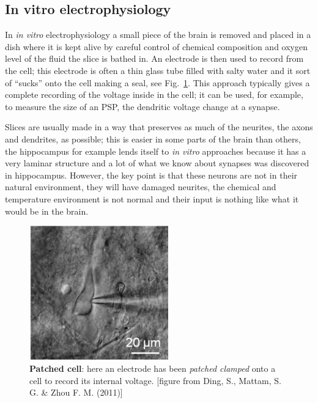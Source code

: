 \documentclass[12pt]{article}
\begin{document}
\subsection*{In vitro electrophysiology}

In \textsl{in vitro} electrophysiology a small piece of the brain is
removed and placed in a dish where it is kept alive by careful control
of chemical composition and oxygen level of the fluid the slice is
bathed in. An electrode is then used to record from the cell; this
electrode is often a thin glass tube filled with salty water and it
sort of ``sucks'' onto the cell making a seal, see
Fig.~\ref{fig:patch}. This approach typically gives a complete
recording of the voltage inside in the cell; it can be used, for
example, to measure the size of an PSP, the dendritic voltage change
at a synapse.

Slices are usually made in a way that preserves as much of the
neurites, the axons and dendrites, as possible; this is easier in some
parts of the brain than others, the hippocampus for example lends
itself to \textsl{in vitro} approaches because it has a very laminar
structure and a lot of what we know about synapses was discovered in
hippocampus. However, the key point is that these neurons are not in
their natural environment, they will have damaged neurites, the
chemical and temperature environment is not normal and their input is
nothing like what it would be in the brain.

\begin{figure}
  \begin{center}
    \includegraphics[width=6cm]{patch.png}
    \end{center}
  \caption{\textbf{Patched cell}: here an electrode has been \textsl{patched clamped} onto a cell to record its internal voltage. [figure from Ding, S., Mattam, S. G. \& Zhou F. M. (2011)]\label{fig:patch}}
\end{figure}
\end{document}

